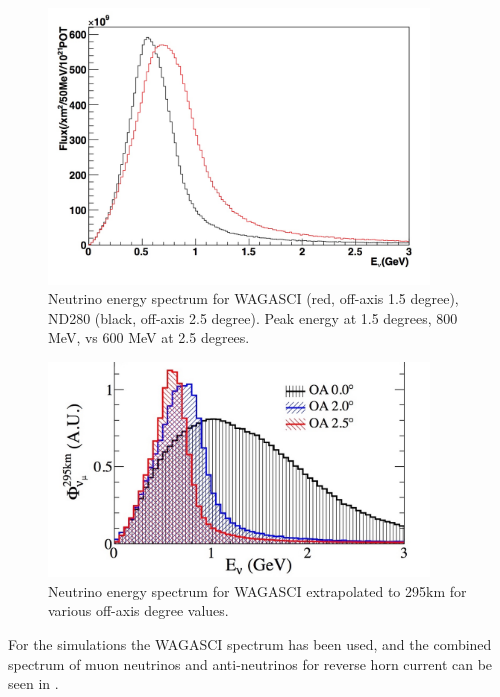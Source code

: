 
\begin{figure}[h!]
\centering
\includegraphics[width=0.9\textwidth]{figures/NeutrinoChap/ND280vsWAGASCIspectrum.jpeg}
\caption{Neutrino energy spectrum for WAGASCI (red, off-axis 1.5 degree), ND280 (black, off-axis 2.5 degree). Peak energy at 1.5 degrees, 800 MeV, vs 600 MeV at 2.5 degrees.}
\label{fig:T2KAxis}
\end{figure}

\begin{figure}[h!]
\centering
\includegraphics[width=0.9\textwidth]{figures/NeutrinoChap/offAxisFlux.jpeg}
\caption{Neutrino energy spectrum for WAGASCI extrapolated to 295km for various off-axis degree values.}
\label{fig:T2KAxis2}
\end{figure}

For the simulations the WAGASCI spectrum has been used, and the combined spectrum of muon neutrinos and anti-neutrinos for reverse horn current can be seen in .


